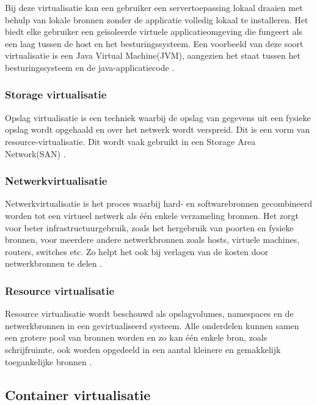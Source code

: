 Bij deze virtualisatie kan een gebruiker een servertoepassing lokaal draaien met behulp van lokale bronnen zonder de applicatie volledig lokaal te installeren. Het biedt elke gebruiker een geïsoleerde virtuele applicatieomgeving die fungeert als een laag tussen de host en het besturingssysteem. Een voorbeeld van deze soort virtualisatie is een Java Virtual Machine(JVM), aangezien het staat tussen het besturingssysteem en de java-applicatiecode \autocite{Kedia2013}. 

\subsubsection{Storage virtualisatie}

Opslag virtualisatie is een techniek waarbij de opslag van gegevens uit een fysieke opslag wordt opgehaald en over het netwerk wordt verspreid. Dit is een vorm van resource-virtualisatie. Dit wordt vaak gebruikt in een Storage Area Network(SAN) \autocite{Kedia2013}.

\subsubsection{Netwerkvirtualisatie}

Netwerkvirtualisatie is het proces waarbij hard- en softwarebronnen gecombineerd worden tot een virtueel netwerk als één enkele verzameling bronnen. Het zorgt voor beter infrastructuurgebruik, zoals het hergebruik van poorten en fysieke bronnen, voor meerdere andere netwerkbronnen zoals hosts, virtuele machines, routers, switches etc. Zo helpt het ook bij verlagen van de kosten door netwerkbronnen te delen \autocite{Kedia2013}.

\subsubsection{Resource virtualisatie}

Resource virtualisatie wordt beschouwd als opslagvolumes, namespaces en de netwerkbronnen in een gevirtualiseerd systeem. Alle onderdelen kunnen samen een grotere pool van bronnen worden en zo kan één enkele bron, zoals schrijfruimte, ook worden opgedeeld in een aantal kleinere en gemakkelijk toegankelijke bronnen \autocite{Kedia2013}.

\subsection{Container virtualisatie}

